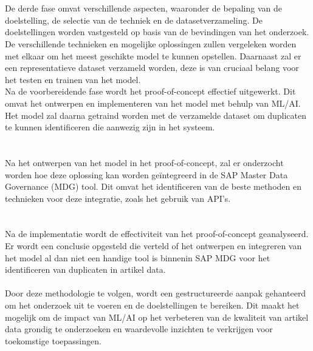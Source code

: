 \section{}%
\label{sec:Proof-of-ConceptM}
De derde fase omvat verschillende aspecten, waaronder de bepaling van de doelstelling, de selectie van de techniek en de datasetverzameling. De doelstellingen worden vastgesteld op basis van de bevindingen van het onderzoek. De verschillende technieken en mogelijke oplossingen zullen vergeleken worden met elkaar om het meest geschikte model te kunnen opstellen. Daarnaast zal er een representatieve dataset verzameld worden, deze is van cruciaal belang voor het testen en trainen van het model. 
\\Na de voorbereidende fase wordt het proof-of-concept effectief uitgewerkt. Dit omvat het ontwerpen en implementeren van het model met behulp van ML/AI. Het model zal daarna getraind worden met de verzamelde dataset om duplicaten te kunnen identificeren die aanwezig zijn in het systeem. 

\section{}%
\label{sec:IntegratieM}
Na het ontwerpen van het model in het proof-of-concept, zal er onderzocht worden hoe deze oplossing kan worden geïntegreerd in de SAP Master Data Governance (MDG) tool. Dit omvat het identificeren van de beste methoden en technieken voor deze integratie, zoals het gebruik van API's.

\section{}%
\label{sec:ConclusieM}
Na de implementatie wordt de effectiviteit van het proof-of-concept geanalyseerd. Er wordt een conclusie opgesteld die verteld of het ontwerpen en integreren van het model al dan niet een handige tool is binnenin SAP MDG voor het identificeren van duplicaten in artikel data. 
\\ \\
Door deze methodologie te volgen, wordt een gestructureerde aanpak gehanteerd om het onderzoek uit te voeren en de doelstellingen te bereiken. Dit maakt het mogelijk om de impact van ML/AI op het verbeteren van de kwaliteit van artikel data grondig te onderzoeken en waardevolle inzichten te verkrijgen voor toekomstige toepassingen.